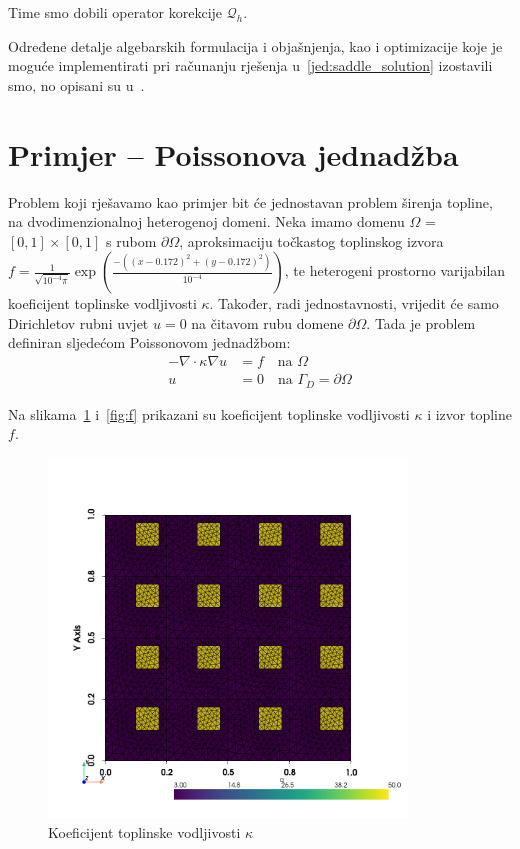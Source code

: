 \documentclass[zavrsnirad]{fer}
\begin{document}
Time smo dobili operator korekcije $\mathcal{Q}_h$.

Određene detalje algebarskih formulacija i objašnjenja, kao i optimizacije koje je moguće implementirati
pri računanju rješenja u~\ref{jed:saddle_solution} izostavili smo, no opisani su u~\cite{msfem_efficient_lod}.

\section{Primjer – Poissonova jednadžba}

Problem koji rješavamo kao primjer bit će jednostavan problem širenja topline, na dvodimenzionalnoj heterogenoj domeni.
Neka imamo domenu $\Omega$ = $[0, 1] \times [0, 1]$ s rubom $\partial\Omega$,
aproksimaciju točkastog toplinskog izvora $f = \frac{1}{\sqrt{10^{-4}\pi}}\exp(\frac{-({(x-0.172)}^2 + {(y-0.172)}^2)}{10^{-4}})$,
te heterogeni prostorno varijabilan koeficijent toplinske vodljivosti $\kappa$.
Također, radi jednostavnosti, vrijedit će samo Dirichletov rubni uvjet $u = 0$ na čitavom rubu domene $\partial\Omega$.
Tada je problem definiran sljedećom Poissonovom jednadžbom:
\begin{align}
  \label{jed:poisson}
  -\nabla\cdot \kappa\nabla u &= f \quad \text{na } \Omega \\
  u &= 0 \quad \text{na } \Gamma_D = \partial\Omega
\end{align}

Na slikama\ \ref{fig:kappa} i\ \ref{fig:f} prikazani su koeficijent toplinske vodljivosti $\kappa$ i izvor topline $f$.

\begin{figure}[h]
  \centering
  \includegraphics[width=0.85\textwidth]{Figures/q.png}
  \caption{Koeficijent toplinske vodljivosti $\kappa$}
  \label{fig:kappa}
\end{figure}
\end{document}
